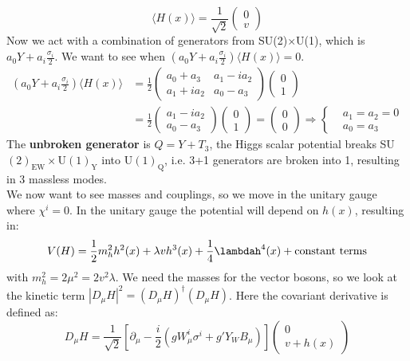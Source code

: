 \documentclass[../main.tex]{subfiles}
\begin{document}
\[
\langle H(x)\rangle=\frac{1}{\sqrt{2}}\begin{pmatrix}
    0\\v
\end{pmatrix}
\]
Now we act with a combination of generators from SU(2)$\times$U(1), which is $a_0Y+a_i\frac{\sigma_i}{2}$. We want to see when $(a_0Y+a_i\frac{\sigma_i}{2})\langle H(x)\rangle=0$.
\begin{align*}
\left(a_0Y+a_i\frac{\sigma_i}{2}\right)\langle H(x)\rangle&=\frac{1}{2}\left(\begin{array}{cc}
    a_0+a_3 & a_1-ia_2 \\
    a_1+ia_2 & a_0-a_3
\end{array}\right)\begin{pmatrix}
    0\\1
\end{pmatrix}\\
&=\frac{1}{2}\begin{pmatrix}
    a_1-ia_2\\a_0-a_3
\end{pmatrix}
\begin{pmatrix}
    0\\1
\end{pmatrix}=\begin{pmatrix}
    0\\0
\end{pmatrix}\Rightarrow\left\{\begin{aligned}
    &a_1=a_2=0\\
    &a_0=a_3
\end{aligned}\right.
\end{align*}
The \textbf{unbroken generator} is $Q=Y+T_3$, the Higgs scalar potential breaks SU$(2)_{\text{EW}}\times$U$(1)_{\text{Y}}$ into U$(1)_{\text{Q}}$, i.e. 3+1 generators are broken into 1, resulting in 3 massless modes.\\
We now want to see masses and couplings, so we move in the unitary gauge where $\chi^i=0$. In the unitary gauge the potential will depend on $h(x)$, resulting in:
\[
V(H)=\frac{1}{2}m_h^2h^2(x)+\lambda vh^3(x)+\frac{1}{4}\lambdah^4(x)+\text{constant terms}
\]
with $m_h^2=2\mu^2=2v^2\lambda$. We need the masses for the vector bosons, so we look at the kinetic term
$|D_\mu H|^2=(D_\mu H)^\dagger(D_\mu H)$. Here the covariant derivative is defined as:
\[
D_\mu H=\frac{1}{\sqrt{2}}\left[\partial_\mu-\frac{i}{2}(gW_\mu^i\sigma^i+g'Y_WB_\mu)\right]\begin{pmatrix}0 \\ v+h(x)\end{pmatrix}
\]
\end{document}
